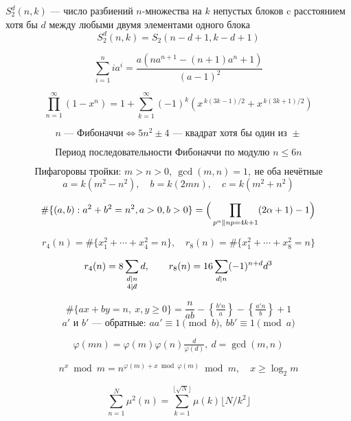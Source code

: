 $S_2^d(n,k)$ — число разбиений $n$-множества на $k$ непустых блоков c расстоянием хотя бы $d$ между любыми двумя элементами одного блока
\[
S_2^d(n,k)=S_2(n-d+1,k-d+1)
\]

\[
\sum_{i=1}^n i a^i=\frac{a(n a^{n+1}-(n+1)a^n+1)}{(a-1)^2}
\]

\[
\prod_{n=1}^\infty(1-x^n)
=
1+\sum_{k=1}^{\infty}(-1)^k\!\left(x^{\,k(3k-1)/2}+x^{\,k(3k+1)/2}\right)
\]

\[
n \text{ — Фибоначчи} \iff 5n^2\pm4 \text{ — квадрат хотя бы один из } \pm
\]

\[
\text{Период последовательности Фибоначчи по модулю } n \le 6n
\]

\[
\text{Пифагоровы тройки: } m>n>0,\ \gcd(m,n)=1,\ \text{не оба нечётные}
\]
\[
a=k(m^2-n^2),\quad b=k(2mn),\quad c=k(m^2+n^2)
\]

\[
\#\{(a,b):a^2+b^2=n^2,a>0,b>0\}
=\Big(\prod_{p^\alpha\parallel n \\ p = 4k+1}(2\alpha+1)-1\Big)
\]

\[
r_4(n)=\#\{x_1^2+\cdots+x_4^2=n\},\quad
r_8(n)=\#\{x_1^2+\cdots+x_8^2=n\}
\]

\[
r_4(n)=8\sum_{\substack{d\mid n\\4\not\mid d}}d,\qquad
r_8(n)=16\sum_{d\mid n}(-1)^{n+d}d^3
\]

\[
\#\{ax+by=n,\ x,y\ge0\}=\frac{n}{ab}-\left\{\tfrac{b'n}{a}\right\}-\left\{\tfrac{a'n}{b}\right\}+1
\]
\[
a'\text{ и }b' \text{ — обратные: } aa'\equiv1\pmod b,\ bb'\equiv1\pmod a
\]

\[
\varphi(mn)=\varphi(m)\varphi(n)\tfrac{d}{\varphi(d)},\ d=\gcd(m,n)
\]

\[
n^x\bmod m = n^{\varphi(m)+x\bmod \varphi(m)}\bmod m,\quad x\ge\log_2 m
\]

\[
\sum_{n=1}^N \mu^2(n)=\sum_{k=1}^{\lfloor\sqrt N\rfloor}\mu(k)\lfloor N/k^2\rfloor
\]

